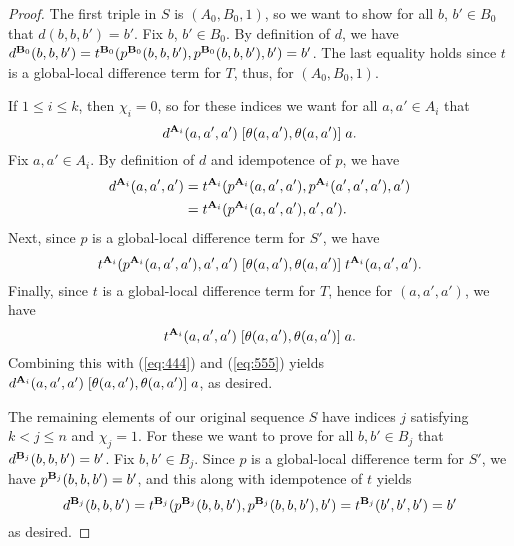 \begin{proof}
The first triple in $S$ is $(A_0, B_0, 1)$, so we want to show for all $b$, $b' \in B_0$ that
$d(b,b,b') = b'$.
Fix $b$, $b' \in B_0$. By definition of $d$,
we have $d^{\mathbf{B}_0}(b,b,b') = t^{\mathbf{B}_0}(p^{\mathbf{B}_0}(b,b,b'), p^{\mathbf{B}_0}(b,b,b'), b') =b'$.
The last equality holds since $t$ is a global-local difference term for $T$, thus,
for $(A_0, B_0, 1)$.

If $1\leq i \leq k$, then $\chi_i =0$, so for these indices we want
for all $a, a' \in A_i$ that
\[
d^{\mathbf{A}_i}(a,a',a') \mathrel{[\theta(a,a'), \theta(a,a')]} a.
\]
Fix $a, a'\in A_i$.
By definition of $d$ and idempotence of $p$, we have
\begin{align}
  d^{\bA_i}(a,a',a') &=
  t^{\bA_i}(p^{\bA_i}(a,a',a'), p^{\bA_i}(a',a',a'), a')   \label{eq:444}\\
  &=t^{\bA_i}(p^{\bA_i}(a,a',a'), a', a'). \nonumber
\end{align}
Next, since $p$ is a global-local difference term for $S'$, we have
\begin{equation}
  \label{eq:555}
  t^{\bA_i}(p^{\bA_i}(a,a',a'), a', a')
 \comm{\theta(a,a')}{\theta(a,a')}
 t^{\bA_i}(a, a', a').
\end{equation}
Finally, since $t$ is a global-local difference term for $T$, hence for
$(a, a', a')$,  %
we have 
\[
t^{\mathbf{A}_i}(a, a', a') \mathrel{[\theta(a,a'), \theta(a,a')]} a.
\]
Combining this with (\ref{eq:444}) and (\ref{eq:555}) yields
$d^{\mathbf{A}_i}(a,a',a') \mathrel{[\theta(a,a'), \theta(a,a')]} a$,
as desired.

The remaining elements of our original sequence $S$
have indices $j$ satisfying $k<j\leq n$ and $\chi_j = 1$.
For these we want to prove for all $b, b'\in B_j$ that $d^{\mathbf{B}_j}(b,b,b') = b'$.
Fix $b, b'\in B_j$. Since $p$ is a global-local difference term for $S'$, we have
$p^{\mathbf{B}_j}(b,b,b') = b'$, and this along with idempotence of $t$ yields
\[
d^{\mathbf{B}_j}(b,b,b') =
t^{\mathbf{B}_j}(p^{\mathbf{B}_j}(b,b,b'), p^{\mathbf{B}_j}(b,b,b'), b')
=t^{\mathbf{B}_j}(b', b', b') =b'\]
as desired.
\end{proof}

